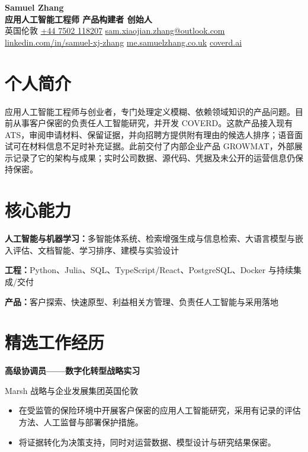 \documentclass[UTF8,11pt,a4paper,fontset=none]{ctexart}
\newcommand{\cvdate}[1]{{\normalfont\normalsize\bfseries #1}}
\newcommand{\primaryrole}[4]{%
  \textbf{#1}\par\vspace{-1pt}
  {\small\color{muted}#2\enspace\textbullet\enspace #4\hfill\color{ink}\cvdate{#3}\par}\vspace{-1pt}
}
\begin{document}
\begin{center}
  {\huge\bfseries Samuel Zhang}\\[2pt]
  {\large\bfseries 应用人工智能工程师 \textperiodcentered{} 产品构建者 \textperiodcentered{} 创始人}\\[4pt]
  \small
  英国伦敦 \enspace\textbullet\enspace
  \href{tel:+447502118207}{+44 7502 118207} \enspace\textbullet\enspace
  \href{mailto:sam.xiaojian.zhang@outlook.com}{sam.xiaojian.zhang@outlook.com}\\[-1pt]
  \href{https://www.linkedin.com/in/samuel-xj-zhang/}{linkedin.com/in/samuel-xj-zhang}
  \enspace\textbullet\enspace
  \href{https://me.samuelzhang.co.uk}{me.samuelzhang.co.uk}
  \enspace\textbullet\enspace
  \href{https://coverd.ai}{coverd.ai}
\end{center}

\section{个人简介}
应用人工智能工程师与创业者，专门处理定义模糊、依赖领域知识的产品问题。目前从事客户保密的负责任人工智能研究，并开发 COVERD。这款产品接入现有 ATS，审阅申请材料、保留证据，并向招聘方提供附有理由的候选人排序；语音面试可在材料信息不足时补充证据。此前交付了内部企业产品 GROWMAT，外部展示记录了它的架构与成果；实时公司数据、源代码、凭据及未公开的运营信息仍保持保密。

\section{核心能力}
\textbf{人工智能与机器学习：}多智能体系统、检索增强生成与信息检索、大语言模型与嵌入评估、文档智能、学习排序、建模与实验设计

\textbf{工程：}Python、Julia、SQL、TypeScript/React、PostgreSQL、Docker 与持续集成/交付

\textbf{产品：}客户探索、快速原型、利益相关方管理、负责任人工智能与采用落地

\section{精选工作经历}

\primaryrole{高级协调员——数字化转型战略实习}{Marsh \textperiodcentered{} 战略与企业发展集团}{2026 年 5 月—至今}{英国伦敦}
\begin{itemize}
  \item 在受监管的保险环境中开展客户保密的应用人工智能研究，采用有记录的评估方法、人工监督与部署保护措施。
  \item 将证据转化为决策支持，同时对运营数据、模型设计与研究结果保密。
\end{itemize}
\end{document}
